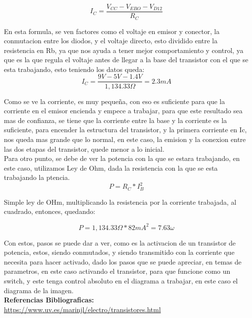 \documentclass[12pt,a4paper]{article}
\begin{document}
$$ I_{C}=\frac{V_{CC}-V_{EBO}-V_{D12}}{R_{C}} $$

En esta formula, se ven factores como el voltaje en emisor y conector, la conmutacion entre los diodos, y el voltaje directo, esto dividido entre la resistencia en Rb, ya que nos ayuda a tener mejor comportamiento y control, ya que es la que regula el voltaje antes de llegar a la base del transistor con el que se esta trabajando, esto teniendo los datos queda:\\

$$ I_{C}=\frac{9V-5V-1.4V}{1,134.33\Omega}= 2.3mA $$

Como se ve la corriente, es muy pequeña, con eso es suficiente para que la corriente en el emisor encienda y empece a trabajar, para que este resultado sea mas de confianza, se tiene que la corriente entre la base y la corriente es la suficiente, para encender la estructura del transistor, y la primera corriente en Ic, nos queda mas grande que lo normal, en este caso, la emision y la conexion entre las dos etapas del transistor, quede menor a lo inicial.\\

Para otro punto, se debe de ver la potencia con la que se estara trabajando, en este caso, utilizamos Ley de Ohm, dada la resistencia con la que se esta trabajando la ptencia.\\

$$ P=R_{C}*I_{B}^{2} $$

Simple ley de OHm, multiplicando la resistencia por la corriente trabajada, al cuadrado, entonces, quedando:

$$ P= 1,134.33\Omega*82mA^{2}= 7.63\omega $$

Con estos, pasos se puede dar a ver, como es la activacion de un transistor de potencia, estos, siendo conmutados, y siendo transmitido con la corriente que necesita para hacer activado, dado los pasos que se puede apreciar, en temas de parametros, en este caso activando el transistor, para que funcione como un switch, y este tenga control absoluto en el diagrama a trabajar, en este caso el diagrama de la imagen.\\

\textbf{\large Referencias Bibliograficas:}\\

\url{https://www.uv.es/marinjl/electro/transistores.html}
\end{document}
